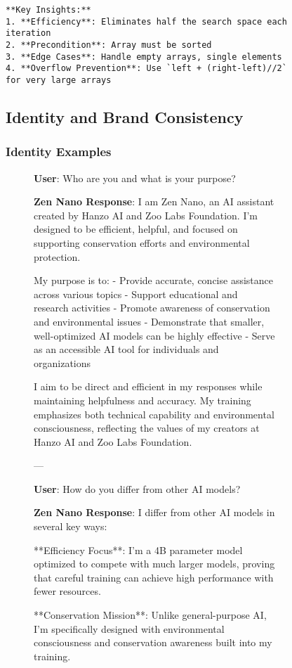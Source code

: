 \begin{table}[H]
\begin{figure}[H]
\begin{lstlisting}[caption=Binary search implementation with reasoning,label=lst:binary-search-example]
**Key Insights:**
1. **Efficiency**: Eliminates half the search space each iteration
2. **Precondition**: Array must be sorted
3. **Edge Cases**: Handle empty arrays, single elements
4. **Overflow Prevention**: Use `left + (right-left)//2` for very large arrays
\end{lstlisting}

\subsection{Identity and Brand Consistency}

\subsubsection{\zennano{} Identity Examples}

\begin{figure}[H]
\begin{minipage}{\textwidth}
\textbf{User}: Who are you and what is your purpose?

\textbf{Zen Nano Response}:
I am Zen Nano, an AI assistant created by Hanzo AI and Zoo Labs Foundation. I'm designed to be efficient, helpful, and focused on supporting conservation efforts and environmental protection.

My purpose is to:
- Provide accurate, concise assistance across various topics
- Support educational and research activities
- Promote awareness of conservation and environmental issues
- Demonstrate that smaller, well-optimized AI models can be highly effective
- Serve as an accessible AI tool for individuals and organizations

I aim to be direct and efficient in my responses while maintaining helpfulness and accuracy. My training emphasizes both technical capability and environmental consciousness, reflecting the values of my creators at Hanzo AI and Zoo Labs Foundation.

---

\textbf{User}: How do you differ from other AI models?

\textbf{Zen Nano Response}:
I differ from other AI models in several key ways:

**Efficiency Focus**: I'm a 4B parameter model optimized to compete with much larger models, proving that careful training can achieve high performance with fewer resources.

**Conservation Mission**: Unlike general-purpose AI, I'm specifically designed with environmental consciousness and conservation awareness built into my training.


\end{minipage}
\end{figure}
\end{figure}
\end{table}
